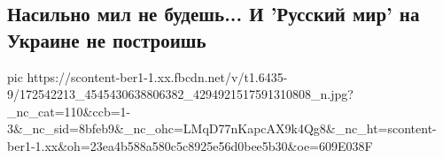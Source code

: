  
 
 
 
 

\subsection{Насильно мил не будешь... И 'Русский мир' на Украине не построишь}
\label{sec:13_04_2021.fb.1.ukraina_rusmir}

\ifcmt
  pic https://scontent-ber1-1.xx.fbcdn.net/v/t1.6435-9/172542213_4545430638806382_4294921517591310808_n.jpg?_nc_cat=110&ccb=1-3&_nc_sid=8bfeb9&_nc_ohc=LMqD77nKapcAX9k4Qg8&_nc_ht=scontent-ber1-1.xx&oh=23ea4b588a580c5c8925e56d0bee5b30&oe=609E038F
\fi


